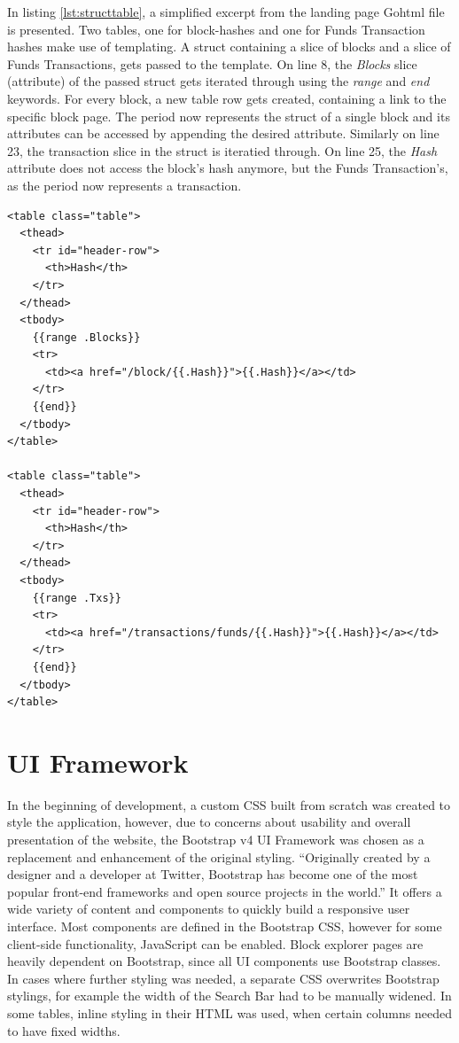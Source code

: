 In listing \ref{lst:structtable}, a simplified excerpt from the landing page Gohtml file is presented. Two tables, one for block-hashes and one for Funds Transaction hashes make use of templating. A struct containing a slice of blocks and a slice of Funds Transactions, gets passed to the template. On line 8, the \emph{Blocks} slice (attribute) of the passed struct gets iterated through using the \emph{range} and \emph{end} keywords. For every block, a new table row gets created, containing a link to the specific block page. The period now represents the struct of a single block and its attributes can be accessed by appending the desired attribute. Similarly on line 23, the transaction slice in the struct is iteratied through. On line 25, the \emph{Hash} attribute does not access the block's hash anymore, but the Funds Transaction's, as the period now represents a transaction.
\begin{lstlisting}[caption={Block and Funds Transaction Tables Accessing a \emph{blocksandtx} Struct},captionpos=b,label={lst:structtable}]
<table class="table">
  <thead>
    <tr id="header-row">
      <th>Hash</th>
    </tr>
  </thead>
  <tbody>
    {{range .Blocks}}
    <tr>
      <td><a href="/block/{{.Hash}}">{{.Hash}}</a></td>
    </tr>
    {{end}}
  </tbody>
</table>

<table class="table">
  <thead>
    <tr id="header-row">
      <th>Hash</th>
    </tr>
  </thead>
  <tbody>
    {{range .Txs}}
    <tr>
      <td><a href="/transactions/funds/{{.Hash}}">{{.Hash}}</a></td>
    </tr>
    {{end}}
  </tbody>
</table>
\end{lstlisting}

\section{UI Framework} \label{sec:uiframeworks}
In the beginning of development, a custom CSS built from scratch was created to style the application, however, due to concerns about usability and overall presentation of the website, the Bootstrap v4 UI Framework \cite{bootstrap} was chosen as a replacement and enhancement of the original styling.
``Originally created by a designer and a developer at Twitter, Bootstrap has become one of the most popular front-end frameworks and open source projects in the world.'' \cite{bootstraphistory}
It offers a wide variety of content and components to quickly build a responsive user interface. Most components are defined in the Bootstrap CSS, however for some client-side functionality, JavaScript can be enabled. Block explorer pages are heavily dependent on Bootstrap, since all UI components use Bootstrap classes. In cases where further styling was needed, a separate CSS overwrites Bootstrap stylings, for example the width of the Search Bar had to be manually widened. In some tables, inline styling in their HTML was used, when certain columns needed to have fixed widths.


